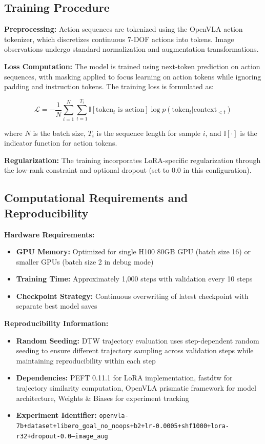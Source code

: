 \subsection{Training Procedure}

\textbf{Preprocessing:} Action sequences are tokenized using the OpenVLA action tokenizer, which discretizes continuous 7-DOF actions into tokens. Image observations undergo standard normalization and augmentation transformations.

\textbf{Loss Computation:} The model is trained using next-token prediction on action sequences, with masking applied to focus learning on action tokens while ignoring padding and instruction tokens. The training loss is formulated as:

\begin{equation}
\label{eq:ce-loss}
\mathcal{L} = -\frac{1}{N} \sum_{i=1}^{N} \sum_{t=1}^{T_i} \mathbb{I}[\text{token}_t \text{ is action}] \log p(\text{token}_t | \text{context}_{<t})
\end{equation}

where $N$ is the batch size, $T_i$ is the sequence length for sample $i$, and $\mathbb{I}[\cdot]$ is the indicator function for action tokens.

\textbf{Regularization:} The training incorporates LoRA-specific regularization through the low-rank constraint and optional dropout (set to 0.0 in this configuration).

\subsection{Computational Requirements and Reproducibility}

\textbf{Hardware Requirements:}
\begin{itemize}
    \item \textbf{GPU Memory:} Optimized for single H100 80GB GPU (batch size 16) or smaller GPUs (batch size 2 in debug mode)
    \item \textbf{Training Time:} Approximately 1,000 steps with validation every 10 steps
    \item \textbf{Checkpoint Strategy:} Continuous overwriting of latest checkpoint with separate best model saves
\end{itemize}

\textbf{Reproducibility Information:}
\begin{itemize}
    \item \textbf{Random Seeding:} DTW trajectory evaluation uses step-dependent random seeding to ensure different trajectory sampling across validation steps while maintaining reproducibility within each step
    \item \textbf{Dependencies:} PEFT 0.11.1 for LoRA implementation, fastdtw for trajectory similarity computation, OpenVLA prismatic framework for model architecture, Weights \& Biases for experiment tracking
    \item \textbf{Experiment Identifier:} \texttt{openvla-7b+dataset+libero\_goal\_no\_noops+b2+lr-0.0005+shf1000+lora-r32+dropout-0.0--image\_aug}
\end{itemize}

